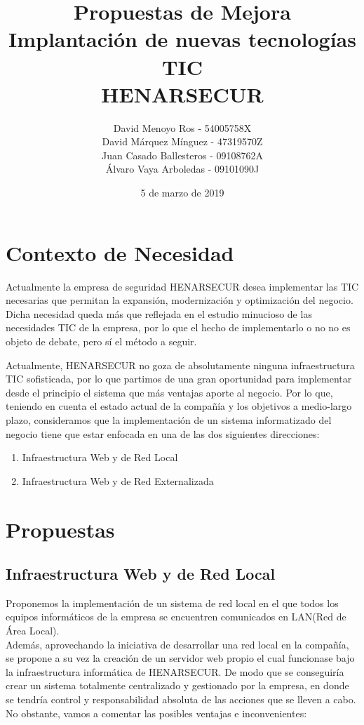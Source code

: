 \documentclass[12pt,letterpaper]{article}
\title{Propuestas de Mejora\\ Implantación de nuevas tecnologías TIC\\ \textbf{HENARSECUR}}
\author{David Menoyo Ros - 54005758X\\
		David Márquez Mínguez - 47319570Z\\
		Juan Casado Ballesteros - 09108762A\\
		Álvaro Vaya Arboledas - 09101090J\\
		}
\date{5 de marzo de 2019}
\begin{document}
	\maketitle %
	\newpage
	
	\section{Contexto de Necesidad}
	Actualmente la empresa de seguridad HENARSECUR desea implementar las TIC necesarias que permitan la expansión, modernización y optimización del negocio.\\
	Dicha necesidad queda más que reflejada en el estudio minucioso de las necesidades TIC de la empresa, por lo que el hecho de implementarlo o no no es objeto de debate, pero sí el método a seguir.\par
	Actualmente, HENARSECUR no goza de absolutamente ninguna infraestructura TIC sofisticada, por lo que partimos de una gran oportunidad para implementar desde el principio el sistema que más ventajas aporte al negocio. Por lo que, teniendo en cuenta el estado actual de la compañía y los objetivos a medio-largo plazo, consideramos que la implementación de un sistema informatizado del negocio tiene que estar enfocada en una de las dos siguientes direcciones:
	
	
	\begin{enumerate}
		\item Infraestructura Web y de Red Local
		\item Infraestructura Web y de Red Externalizada
	\end{enumerate}
	
	
	
	
	\section{Propuestas}
	
		\subsection{Infraestructura Web y de Red Local}
	
	Proponemos la implementación de un sistema de red local en el que todos los equipos informáticos de la empresa se encuentren comunicados en LAN(Red de Área Local).\\
	Además, aprovechando la iniciativa de desarrollar una red local en la compañía, se propone a su vez la creación de un servidor web propio el cual funcionase bajo la infraestructura informática de HENARSECUR. De modo que se conseguiría crear un sistema totalmente centralizado y gestionado por la empresa, en donde se tendría control y responsabilidad absoluta de las acciones que se lleven a cabo.\\ No obstante, vamos a comentar las posibles ventajas e inconvenientes:
\end{document}
